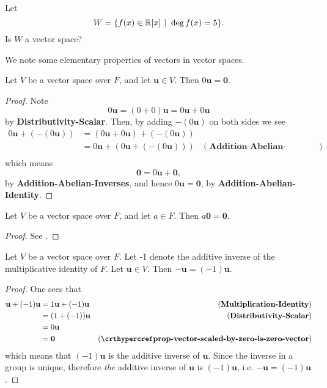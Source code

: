 \begin{exercise}
    Let
    \[
        W = \{f(x) \in \R[x] \vert \deg f(x) = 5\}.
    \]
    Is $W$ a vector space?
\end{exercise}

We note some elementary properties of vectors in vector spaces.
\begin{proposition}\label{prop-vector-scaled-by-zero-is-zero-vector}
    Let $V$ be a vector space over $F$, and let $\textbf{u} \in V$. Then $0\textbf{u} = \textbf{0}$.
\end{proposition}
\begin{proof}
    Note
    \[
        0\textbf{u} = (0 + 0)\textbf{u} = 0\textbf{u} + 0\textbf{u}
    \]
    by \textbf{Distributivity-Scalar}. Then, by adding $-(0\textbf{u})$ on both sides we see
    \begin{align*}
        0\textbf{u} + (-(0\textbf{u})) &= (0\textbf{u} + 0\textbf{u}) + (-(0\textbf{u}))\\
        &= 0\textbf{u} + (0\textbf{u} + (-(0\textbf{u}))) & (\textbf{Addition-Abelian-Associativity})\\
    \end{align*}
    which means
    \[
        \textbf{0} = 0\textbf{u} + \textbf{0},
    \]
    by \textbf{Addition-Abelian-Inverses}, and hence $0\textbf{u} = \textbf{0}$, by \textbf{Addition-Abelian-Identity}.
\end{proof}

\begin{proposition}\label{prop-zero-vector-scaled-by-constant-is-zero-vector}
    Let $V$ be a vector space over $F$, and let $a \in F$. Then $a\textbf{0} = \textbf{0}$.
\end{proposition}
\begin{proof}
    See .
\end{proof}

\begin{proposition}\label{prop-vector-inverse-is-negative-vector}
    Let $V$ be a vector space over $F$. Let -1 denote the additive inverse of the multiplicative identity of $F$. Let $\textbf{u} \in V$. Then $-\textbf{u} = (-1)\textbf{u}$.
\end{proposition}
\begin{proof}
    One sees that
    \begin{align*}
        \textbf{u} + (-1)\textbf{u} &= 1\textbf{u} + (-1)\textbf{u} & (\textbf{Multiplication-Identity})\\
        &= (1 + (-1))\textbf{u} & (\textbf{Distributivity-Scalar})\\
        &= 0\textbf{u}\\
        &= \textbf{0} & (\myref{prop-vector-scaled-by-zero-is-zero-vector})
    \end{align*}
    which means that $(-1)\textbf{u}$ is the additive inverse of $\textbf{u}$. Since the inverse in a group is unique, therefore \textit{the} additive inverse of $\textbf{u}$ is $(-1)\textbf{u}$, i.e. $-\textbf{u} = (-1)\textbf{u}$.
\end{proof}

